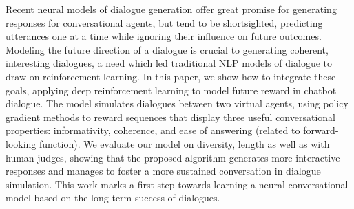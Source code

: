 Recent neural models of dialogue generation offer great promise for generating responses for conversational agents, but tend to be shortsighted, predicting utterances one at a time while ignoring their influence on future outcomes. Modeling the future direction of a dialogue is crucial to generating coherent, interesting dialogues, a need which led traditional NLP models of dialogue to draw on reinforcement learning. In this paper, we show how to integrate these goals, applying deep reinforcement learning to model future reward in chatbot dialogue. The model simulates dialogues between two virtual agents, using policy gradient methods to reward sequences that display three useful conversational properties: informativity, coherence, and ease of answering (related to forward-looking function). We evaluate our model on diversity, length as well as with human judges,  showing that the proposed algorithm generates more interactive responses and manages to foster a more sustained conversation in dialogue simulation. This work marks a first step towards learning a neural conversational model based on the long-term success of dialogues.
